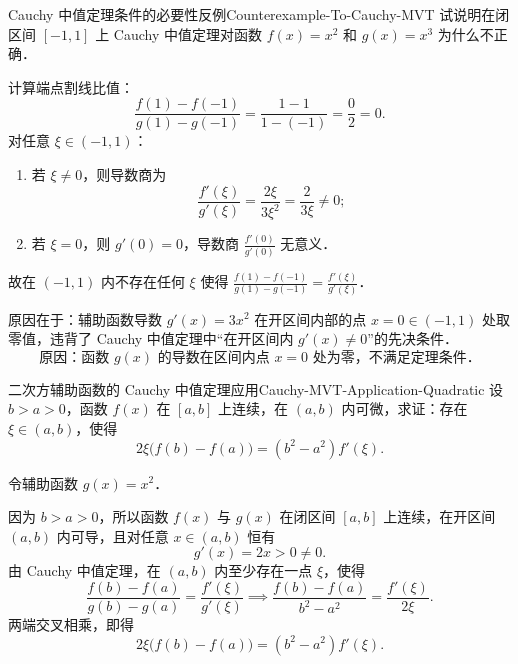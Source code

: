 \begin{problem}{Cauchy 中值定理条件的必要性反例}{Counterexample-To-Cauchy-MVT}
    试说明在闭区间 $[-1, 1]$ 上 Cauchy 中值定理对函数 $f(x) = x^2$ 和 $g(x) = x^3$ 为什么不正确．
\end{problem}

\begin{solution}
    计算端点割线比值：
    \begin{equation}
        \frac{f(1) - f(-1)}{g(1) - g(-1)} = \frac{1 - 1}{1 - (-1)} = \frac{0}{2} = 0.
    \end{equation}
    对任意 $\xi \in (-1, 1)$：
    \begin{enumerate}
        \item 若 $\xi \neq 0$，则导数商为
              \begin{equation}
                  \frac{f'(\xi)}{g'(\xi)} = \frac{2\xi}{3\xi^2} = \frac{2}{3\xi} \neq 0;
              \end{equation}
        \item 若 $\xi = 0$，则 $g'(0) = 0$，导数商 $\frac{f'(0)}{g'(0)}$ 无意义．
    \end{enumerate}
    故在 $(-1, 1)$ 内不存在任何 $\xi$ 使得 $\frac{f(1) - f(-1)}{g(1) - g(-1)} = \frac{f'(\xi)}{g'(\xi)}$．

    原因在于：辅助函数导数 $g'(x) = 3x^2$ 在开区间内部的点 $x = 0 \in (-1, 1)$ 处取零值，违背了 Cauchy 中值定理中“在开区间内 $g'(x) \neq 0$”的先决条件．
    \begin{equation}
        \boxed{\text{原因：函数 } g(x) \text{ 的导数在区间内点 } x = 0 \text{ 处为零，不满足定理条件．}}
    \end{equation}
\end{solution}

\begin{problem}{二次方辅助函数的 Cauchy 中值定理应用}{Cauchy-MVT-Application-Quadratic}
    设 $b > a > 0$，函数 $f(x)$ 在 $[a, b]$ 上连续，在 $(a, b)$ 内可微，求证：存在 $\xi \in (a, b)$，使得
    \begin{equation}
        2\xi\bigl( f(b) - f(a) \bigr) = (b^2 - a^2)f'(\xi).
    \end{equation}
\end{problem}

\begin{myproof}
    令辅助函数 $g(x) = x^2$．

    因为 $b > a > 0$，所以函数 $f(x)$ 与 $g(x)$ 在闭区间 $[a, b]$ 上连续，在开区间 $(a, b)$ 内可导，且对任意 $x \in (a, b)$ 恒有
    \begin{equation}
        g'(x) = 2x > 0 \neq 0.
    \end{equation}
    由 Cauchy 中值定理，在 $(a, b)$ 内至少存在一点 $\xi$，使得
    \begin{equation}
        \frac{f(b) - f(a)}{g(b) - g(a)} = \frac{f'(\xi)}{g'(\xi)} \implies \frac{f(b) - f(a)}{b^2 - a^2} = \frac{f'(\xi)}{2\xi}.
    \end{equation}
    两端交叉相乘，即得
    \begin{equation}
        2\xi\bigl( f(b) - f(a) \bigr) = (b^2 - a^2)f'(\xi).
    \end{equation}
\end{myproof}

